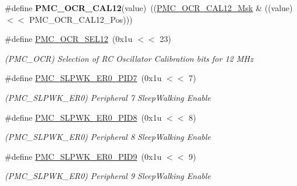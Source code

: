 \begin{DoxyCompactItemize}
\mbox{\label{group__SAMV71__PMC_gabe02650a445a5060a3c8904445b943d7}} 
\#define {\bfseries P\+M\+C\+\_\+\+O\+C\+R\+\_\+\+C\+A\+L12}(value)~((\mbox{\hyperlink{group__SAMV71__PMC_gaebcde6b9f684f22e620db9673ab3131a}{P\+M\+C\+\_\+\+O\+C\+R\+\_\+\+C\+A\+L12\+\_\+\+Msk}} \& ((value) $<$$<$ P\+M\+C\+\_\+\+O\+C\+R\+\_\+\+C\+A\+L12\+\_\+\+Pos)))
\item 
\mbox{\label{group__SAMV71__PMC_ga2dd373794cde6eef1c27f9a73d54f470}} 
\#define \mbox{\hyperlink{group__SAMV71__PMC_ga2dd373794cde6eef1c27f9a73d54f470}{P\+M\+C\+\_\+\+O\+C\+R\+\_\+\+S\+E\+L12}}~(0x1u $<$$<$ 23)
\begin{DoxyCompactList}\small\item\em (P\+M\+C\+\_\+\+O\+CR) Selection of RC Oscillator Calibration bits for 12 M\+Hz \end{DoxyCompactList}\item 
\mbox{\label{group__SAMV71__PMC_gaa59839bba436544207971815c2c11e56}} 
\#define \mbox{\hyperlink{group__SAMV71__PMC_gaa59839bba436544207971815c2c11e56}{P\+M\+C\+\_\+\+S\+L\+P\+W\+K\+\_\+\+E\+R0\+\_\+\+P\+I\+D7}}~(0x1u $<$$<$ 7)
\begin{DoxyCompactList}\small\item\em (P\+M\+C\+\_\+\+S\+L\+P\+W\+K\+\_\+\+E\+R0) Peripheral 7 Sleep\+Walking Enable \end{DoxyCompactList}\item 
\mbox{\label{group__SAMV71__PMC_gad5f6db0f89c81394a149de9b818d26ca}} 
\#define \mbox{\hyperlink{group__SAMV71__PMC_gad5f6db0f89c81394a149de9b818d26ca}{P\+M\+C\+\_\+\+S\+L\+P\+W\+K\+\_\+\+E\+R0\+\_\+\+P\+I\+D8}}~(0x1u $<$$<$ 8)
\begin{DoxyCompactList}\small\item\em (P\+M\+C\+\_\+\+S\+L\+P\+W\+K\+\_\+\+E\+R0) Peripheral 8 Sleep\+Walking Enable \end{DoxyCompactList}\item 
\mbox{\label{group__SAMV71__PMC_ga216d70ec1d38b2c139dd82ed58325b4b}} 
\#define \mbox{\hyperlink{group__SAMV71__PMC_ga216d70ec1d38b2c139dd82ed58325b4b}{P\+M\+C\+\_\+\+S\+L\+P\+W\+K\+\_\+\+E\+R0\+\_\+\+P\+I\+D9}}~(0x1u $<$$<$ 9)
\begin{DoxyCompactList}\small\item\em (P\+M\+C\+\_\+\+S\+L\+P\+W\+K\+\_\+\+E\+R0) Peripheral 9 Sleep\+Walking Enable \end{DoxyCompactList}\item 
$$
\end{DoxyCompactItemize}

